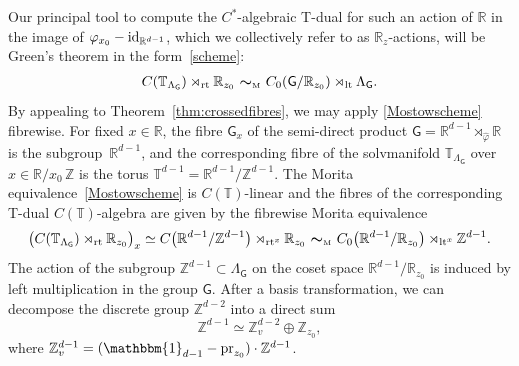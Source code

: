 \documentclass[pdftex]{sigma}
\numberwithin{equation}{section}
\newcommand{\Z}{\zed}
\newcommand{\mbf}[1]{{\boldsymbol {#1} }}
\def\Id{{\rm id}}
\newcommand{\unit}{\mathbbm{1}} 			%
\newcommand{\sfG}{\mathsf{G}}
\newcommand{\lt}{{\rm lt}}
\newcommand{\rt}{{\rm rt}}
\newcommand{\R}{\real}
\newcommand{\zed}{{\mathbb Z}} %
\newcommand{\real}{{\mathbb R}} %
\newcommand{\torus}{{\mathbb T}} %
\newcommand{\proj}{{\rm pr}}
\begin{document}
Our principal tool to compute the $C^*$-algebraic
T-dual for such an action of $\R$ in the image of $\varphi_{x_0}-\Id_{\R^{d-1}}$, which we collectively refer to as
$\R_z$-actions, will be Green's theorem in the form~\eqref{scheme}:
\begin{gather}\label{Mostowscheme}
C(\torus_{\Lambda_\sfG})\rtimes_\rt \real_{ z_0} \ \mbf\sim_{\text{\tiny M}} \
C_0(\sfG/\real_{ z_0})\rtimes_\lt \Lambda_\sfG .
\end{gather}
By appealing to
Theorem~\ref{thm:crossedfibres}, we may apply \eqref{Mostowscheme}
fibrewise. For fixed $x\in\R$, the fibre $\sfG_x$ of the semi-direct
product $\sfG=\R^{d-1}\rtimes_{\hat\varphi}\R$ is the subgroup~$\R^{d-1}$, and the corresponding fibre of
the solvmanifold $\torus_{\Lambda_\sfG}$ over $x\in\R/x_0\,\Z$ is the
torus $\torus^{d-1}=\R^{d-1}/\Z^{d-1}$. The Morita
equivalence~\eqref{Mostowscheme} is $C(\torus)$-linear and the fibres of the corresponding
T-dual $C(\torus)$-algebra are given by the fibrewise Morita
equivalence
\begin{gather}\label{eq:Mostowschemefiber}
\big(C(\torus_{\Lambda_\sfG})\rtimes_\rt\real_{ z_0}\big)_x \simeq
C\big(\R^{d-1}/\Z^{d-1}\big)\rtimes_{\rt^x}\real_{ z_0} \
\mbf\sim_{\text{\tiny M}} \
C_0\big(\real^{d-1}/\R_{ z_0}\big)\rtimes_{\lt^x}\Z^{d-1} .
\end{gather}
The action of the subgroup $\Z^{d-1}\subset\Lambda_\sfG$ on the
coset space $\R^{d-1}/\R_{ z_0}$ is induced by left multiplication in the
group $\sfG$.
After a basis transformation, we can decompose the discrete group $\Z^{d-2}$ into a direct sum
\[
\Z^{d-1} \simeq \Z_v^{d-2}\oplus\Z_{ z_0} ,
\]
where $\Z_v^{d-1} = (\unit_{d-1}-\proj_{z_0})\cdot\Z^{d-1}$.
\end{document}
